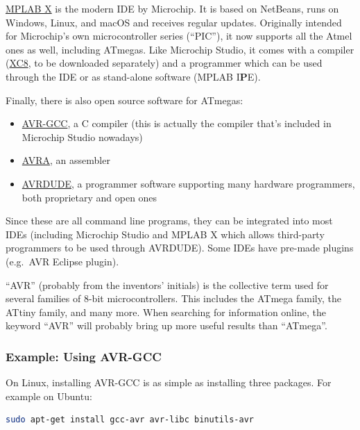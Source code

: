 \documentclass{article}
\newenvironment{note}{\begin{tcolorbox}[colback=blue!5!white,colframe=blue!75!black,title=\textbf{Note}]}{\end{tcolorbox}}
\begin{document}
\href{https://www.microchip.com/en-us/tools-resources/develop/mplab-x-ide}{MPLAB X} is the modern IDE by Microchip. It is based on NetBeans, runs on Windows, Linux, and macOS and receives regular updates. Originally intended for Microchip's own microcontroller series (``PIC''), it now supports all the Atmel ones as well, including ATmegas. Like Microchip Studio, it comes with a compiler (\href{https://www.microchip.com/en-us/tools-resources/develop/mplab-xc-compilers/xc8}{XC8}, to be downloaded separately) and a programmer which can be used through the IDE or as stand-alone software (MPLAB I\textbf{P}E). 

Finally, there is also open source software for ATmegas:
\begin{itemize}
\item \href{https://www.nongnu.org/avr/}{AVR-GCC}, a C compiler (this is actually the compiler that's included in Microchip Studio nowadays)
\item \href{https://github.com/Ro5bert/avra}{AVRA}, an assembler
\item \href{https://github.com/avrdudes/avrdude}{AVRDUDE}, a programmer software supporting many hardware programmers, both proprietary and open ones
\end{itemize}

Since these are all command line programs, they can be integrated into most IDEs (including Microchip Studio and MPLAB X which allows third-party programmers to be used through AVRDUDE). Some IDEs have pre-made plugins (e.g.\ AVR Eclipse plugin). 

\begin{note}
``AVR'' (probably from the inventors' initials) is the collective term used for several families of 8-bit microcontrollers. This includes the ATmega family, the ATtiny family, and many more. When searching for information online, the keyword ``AVR'' will probably bring up more useful results than ``ATmega''. 
\end{note}

\subsubsection{Example: Using AVR-GCC}\label{sec:exAvrGcc}
On Linux, installing AVR-GCC is as simple as installing three packages. For example on Ubuntu:
\begin{lstlisting}[language=bash]
sudo apt-get install gcc-avr avr-libc binutils-avr
\end{lstlisting}
\end{document}
